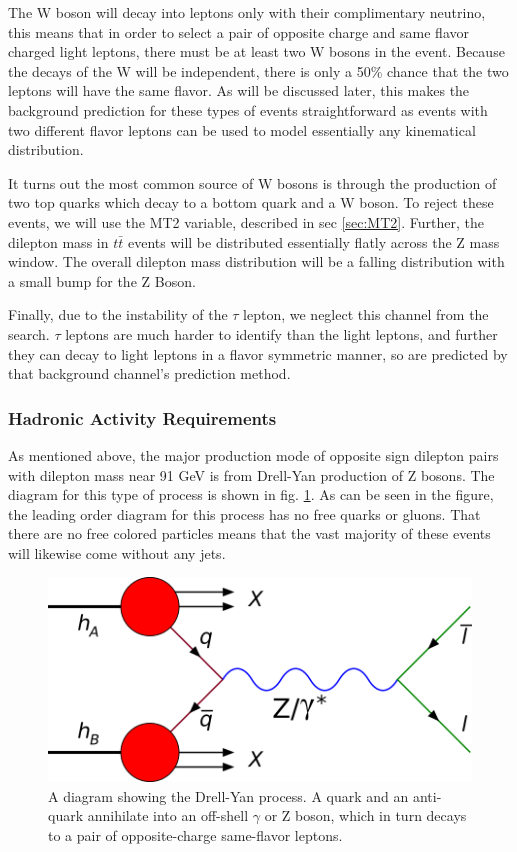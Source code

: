       The W boson will decay into leptons only with their complimentary neutrino, this means that in order to select a pair of opposite charge and same flavor charged light leptons, there must be at least two W bosons in the event. Because the decays of the W will be independent, there is only a 50\% chance that the two leptons will have the same flavor. As will be discussed later, this makes the background prediction for these types of events straightforward as events with two different flavor leptons can be used to model essentially any kinematical distribution.

      It turns out the most common source of W bosons is through the production of two top quarks which decay to a bottom quark and a W boson. To reject these events, we will use the MT2 variable, described in sec \ref{sec:MT2}. Further, the dilepton mass in $t\bar{t}$ events will be distributed essentially flatly across the Z mass window. The overall dilepton mass distribution will be a falling distribution with a small bump for the Z Boson. 

      Finally, due to the instability of the $\tau$ lepton, we neglect this channel from the search. $\tau$ leptons are much harder to identify than the light leptons, and further they can decay to light leptons in a flavor symmetric manner, so are predicted by that background channel's prediction method.

    \subsubsection{Hadronic Activity Requirements}
      As mentioned above, the major production mode of opposite sign dilepton pairs with dilepton mass near 91 GeV is from Drell-Yan production of Z bosons. The diagram for this type of process is shown in fig. \ref{fig:DY-diagram}. As can be seen in the figure, the leading order diagram for this process has no free quarks or gluons. That there are no free colored particles means that the vast majority of these events will likewise come without any jets. 

      \begin{figure}[h!]
        \centering
        \includegraphics[width=.5\textwidth]{figures/Drell-Yan_feynman_edit.png}
        \caption{A diagram showing the Drell-Yan process. A quark and an anti-quark annihilate into an off-shell $\gamma$ or Z boson, which in turn decays to a pair of opposite-charge same-flavor leptons.}
        \label{fig:DY-diagram}
      \end{figure}

